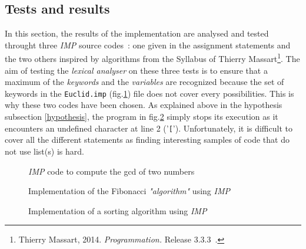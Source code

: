 \documentclass[a4paper,11pt]{article}
\begin{document}
  \subsection{Tests and results}
    In this section, the results of the implementation are analysed and tested throught three \textit{IMP} source codes~: one given in the assignment statements and the two others inspired by algorithms from the Syllabus of Thierry Massart\footnote{Thierry Massart, 2014. \textit{Programmation.} Release 3.3.3~.}. The aim of testing the \textit{lexical analyser} on these three tests is to ensure that a maximum of the \textit{keywords} and the \textit{variables} are recognized because the set of keywords in the \verb|Euclid.imp| (fig.\ref{code:euclid}) file does not cover every possibilities. This is why these two codes have been chosen. As explained above in the hypothesis subsection \ref{hypothesis}, the program in fig.\ref{code:sort} simply stops its execution as it encounters an undefined character at line 2 ('\verb|[|'). Unfortunately, it is difficult to cover all the different statements as finding interesting samples of code that do not use list(s) is hard.
    \begin{figure}[h!] %
      
      \caption{\textit{IMP} code to compute the gcd of two numbers}
      \label{code:euclid}
    \end{figure}
    \begin{figure}[h!]
      
      \caption{Implementation of the Fibonacci \textit{"algorithm"} using \textit{IMP}}
    \end{figure}
    \begin{figure}[h!]
      
      \caption{Implementation of a sorting algorithm using \textit{IMP}}
      \label{code:sort}
    \end{figure}
    
\end{document}
